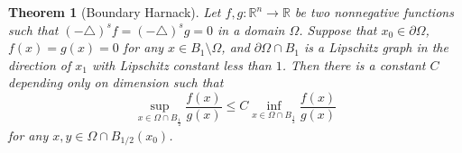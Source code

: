 \documentclass[letterpaper]{article}
\newtheorem{thm}{Theorem}[section]
\numberwithin{equation}{section}
\newcommand{\R}{\mathbb R}
\newcommand{\lap} {\triangle}
\newcommand{\bdary} {\partial}
\begin{document}
\begin{thm} [Boundary Harnack] \label{thm:bharnack}
Let $f,g : \R^n \to \R$ be two nonnegative functions such that $(-\lap)^s f = (-\lap)^s g = 0$ in a domain $\Omega$. Suppose that $x_0 \in \bdary \Omega$, $f(x) = g(x)=0$ for any $x \in B_1 \setminus \Omega$, and $\bdary \Omega \cap B_1$ is a Lipschitz graph in the direction of $x_1$ with Lipschitz constant less than $1$. Then there is a constant $C$ depending only on dimension such that
\begin{equation} \label{eq:bharnack}
 \sup_{x \in \Omega \cap B_{\frac 1 2}} \frac{f(x)}{g(x)} \leq C \inf_{x \in \Omega \cap B_{\frac 1 2}} \frac{f(x)}{g(x)}
\end{equation}
for any $x,y \in \Omega \cap B_{1/2}(x_0)$.
\end{thm}
\end{document}

